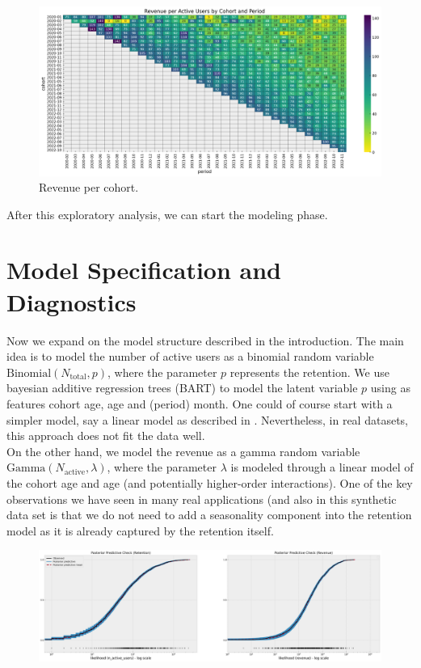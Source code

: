 \documentclass[11pt]{amsart}
\begin{document}
\begin{figure}
    \centering
    \includegraphics[width=\textwidth]{images/revenue_retention_25_0.png}
    \caption{Revenue per cohort.}
    \label{fig:revenue_per_active_user}
\end{figure}

After this exploratory analysis, we can start the modeling phase.

\section{Model Specification and Diagnostics}

Now we expand on the model structure described in the introduction. The main idea is to
model the number of active users as a binomial random variable
$\text{Binomial}(N_{\text{total}}, p)$, where the parameter $p$ represents the retention.
We use bayesian additive regression trees (BART) to model the latent variable $p$ using
as features cohort age, age and (period) month. One could of course start with a simpler
model, say a linear model as described in \cite{orduz_revenue_retention}. Nevertheless,
in real datasets, this approach does not fit the data well. \\

On the other hand, we model the revenue as a gamma random variable
$\text{Gamma}(N_{\text{active}}, \lambda)$, where the parameter $\lambda$ is modeled
through a linear model of the cohort age and age (and potentially higher-order
interactions). One of the key observations we have seen in many real applications (and 
also in this synthetic data set is that we do not need to add a seasonality component
into the retention model as it is already captured by the retention itself.

\begin{figure}
    \includegraphics[width=\textwidth]{images/revenue_retention_37_0.png}
\end{figure}
\end{document}
